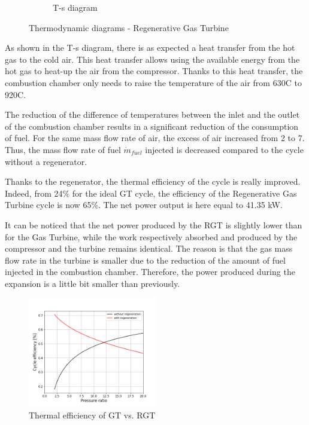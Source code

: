 \begin{figure}[h]
\begin{subfigure}[b]{0.4\textwidth}
         \caption{T-s diagram}
         \label{fig:C5_Ts_RGT}
     \end{subfigure}
        \caption{Thermodynamic diagrams - Regenerative Gas Turbine}
        \label{fig:C5_thermo_diagram_RGT}
\end{figure}

As shown in the T-s diagram, there is as expected a heat transfer from the hot gas to the cold air. This heat transfer allows using the available energy from the hot gas to heat-up the air from the compressor. Thanks to this heat transfer, the combustion chamber only needs to raise the temperature of the air from 630\degree C to 920\degree C. 

The reduction of the difference of temperatures between the inlet and the outlet of the combustion chamber results in a significant reduction of the consumption of fuel. For the same mass flow rate of air, the excess of air increased from 2 to 7. Thus, the mass flow rate of fuel $\dot{m}_{fuel}$ injected is decreased compared to the cycle without a regenerator.  

Thanks to the regenerator, the thermal efficiency of the cycle is really improved. Indeed, from 24\% for the ideal GT cycle, the efficiency of the Regenerative Gas Turbine cycle is now 65\%. The net power output is here equal to 41.35 kW. 

It can be noticed that the net power produced by the RGT is slightly lower than for the Gas Turbine, while the work respectively absorbed and produced by the compressor and the turbine remains identical. The reason is that the gas mass flow rate in the turbine is smaller due to the reduction of the amount of fuel injected in the combustion chamber. Therefore, the power produced during the expansion is a little bit smaller than previously.

\begin{figure}[h]
    \centering
    \includegraphics[width=0.5\textwidth]{Chapitre_5/Images/Efficiency_ideal_Brayton_regen.png}
    \caption{Thermal efficiency of GT vs. RGT}
    \label{fig:C5_eff_RGT-GT}
\end{figure}

